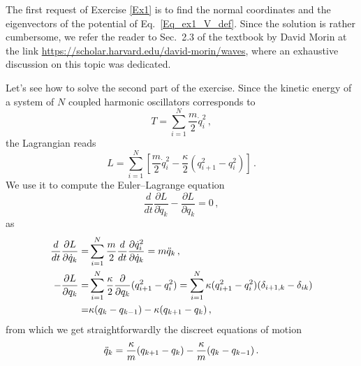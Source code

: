 \begin{sol}
    The first request of Exercise \ref{Ex1} is to find the normal coordinates and the eigenvectors of the potential of Eq.~\eqref{Eq_ex1_V_def}. Since the solution is rather cumbersome, we refer the reader to Sec.~2.3 of the textbook by David Morin at the link \url{https://scholar.harvard.edu/david-morin/waves}, where an exhaustive discussion on this topic was dedicated.

    Let's see how to solve the second part of the exercise. Since the kinetic energy of a system of $N$ coupled harmonic oscillators corresponds to 
    \begin{equation}
        T =\sum_{i=1}^{N} \frac{m}{2} \dot{q}_i^2 \, ,
    \end{equation}
    the Lagrangian reads
    \begin{equation}
        L = \sum_{i=1}^{N} \left[\frac{m}{2} \dot{q}_i^2 - \frac{\kappa}{2} (q_{i+1}^2 - q_i^2)\right] \, . 
    \end{equation}
    We use it to compute the Euler–Lagrange equation
    \begin{equation}
        \frac{d}{dt} \frac{\partial L}{\partial \dot{q}_k} - \frac{\partial L}{\partial q_k} = 0 \,,
    \end{equation}
    as
    \begin{equation}
    \begin{split}
        \frac{d}{dt} \frac{\partial L}{\partial \dot{q}_k} 
        = & \sum_{i=1}^{N} \frac{m}{2} \frac{d}{dt} \frac{\partial \dot{q}_i^2}{\partial \dot{q}_k} = m \Ddot{q}_k \, , \\
        - \frac{\partial L}{\partial q_k} = & \sum_{i=1}^{N} \frac{\kappa}{2} \frac{\partial}{\partial q_k} (q_{i+1}^2 - q_i^2) = \sum_{i=1}^{N} \kappa (q_{i+1}^2 - q_i^2) (\delta_{i+1,k} - \delta_{ik}) \\
        = &  \kappa (q_k - q_{k-1}) - \kappa(q_{k+1} - q_k) \, , 
    \end{split}
    \end{equation}
    from which we get straightforwardly the discreet equations of motion
    \begin{equation}
        \Ddot{q}_k = \frac{\kappa}{m} (q_{k+1} - q_k) - \frac{\kappa}{m} (q_k - q_{k-1}) \, .
        \label{Eq:question_one_discrete_eom}
    \end{equation}
    

\end{sol}
